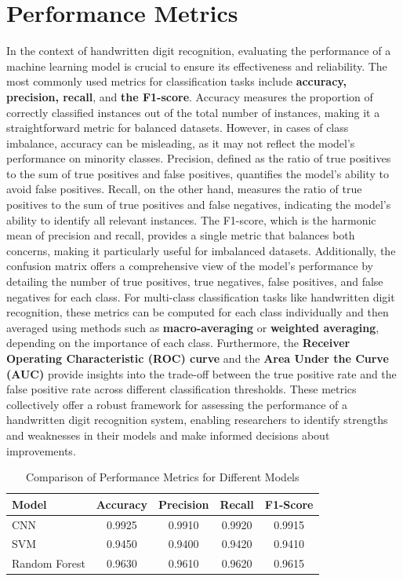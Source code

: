 \documentclass[conference]{IEEEtran}
\begin{document}
\section{Performance Metrics}
In the context of handwritten digit recognition, evaluating the performance of a machine learning model is crucial to ensure its effectiveness and reliability. The most commonly used metrics for classification tasks include \textbf{accuracy, precision, recall}, and \textbf{the F1-score}. Accuracy measures the proportion of correctly classified instances out of the total number of instances, making it a straightforward metric for balanced datasets. However, in cases of class imbalance, accuracy can be misleading, as it may not reflect the model's performance on minority classes. Precision, defined as the ratio of true positives to the sum of true positives and false positives, quantifies the model's ability to avoid false positives. Recall, on the other hand, measures the ratio of true positives to the sum of true positives and false negatives, indicating the model's ability to identify all relevant instances. The F1-score, which is the harmonic mean of precision and recall, provides a single metric that balances both concerns, making it particularly useful for imbalanced datasets. Additionally, the confusion matrix offers a comprehensive view of the model's performance by detailing the number of true positives, true negatives, false positives, and false negatives for each class. For multi-class classification tasks like handwritten digit recognition, these metrics can be computed for each class individually and then averaged using methods such as \textbf{macro-averaging} or \textbf{weighted averaging}, depending on the importance of each class. Furthermore, the \textbf{Receiver Operating Characteristic (ROC) curve} and the \textbf{Area Under the Curve (AUC)} provide insights into the trade-off between the true positive rate and the false positive rate across different classification thresholds. These metrics collectively offer a robust framework for assessing the performance of a handwritten digit recognition system, enabling researchers to identify strengths and weaknesses in their models and make informed decisions about improvements.
\begin{table}[h]
    \centering
    \caption{Comparison of Performance Metrics for Different Models}
    \label{tab:metrics}
    \begin{tabular}{@{}lcccc@{}}
        \toprule
        Model & Accuracy & Precision & Recall & F1-Score \\
        \midrule
        CNN & 0.9925 & 0.9910 & 0.9920 & 0.9915 \\
        SVM & 0.9450 & 0.9400 & 0.9420 & 0.9410 \\
        Random Forest & 0.9630 & 0.9610 & 0.9620 & 0.9615 \\
        \bottomrule
    \end{tabular}
\end{table}
\end{document}

